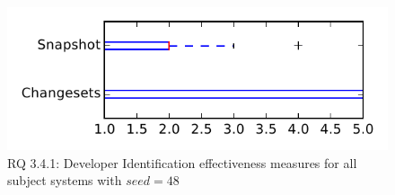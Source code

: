 
\begin{figure}
\centering
\includegraphics[height=0.4\textheight]{figures/dit_seed/rq1_tiny_48}
\caption{RQ 3.4.1: Developer Identification effectiveness measures for all subject systems with $seed=48$}
\label{fig:dit_seed:rq1:tiny}
\end{figure}

